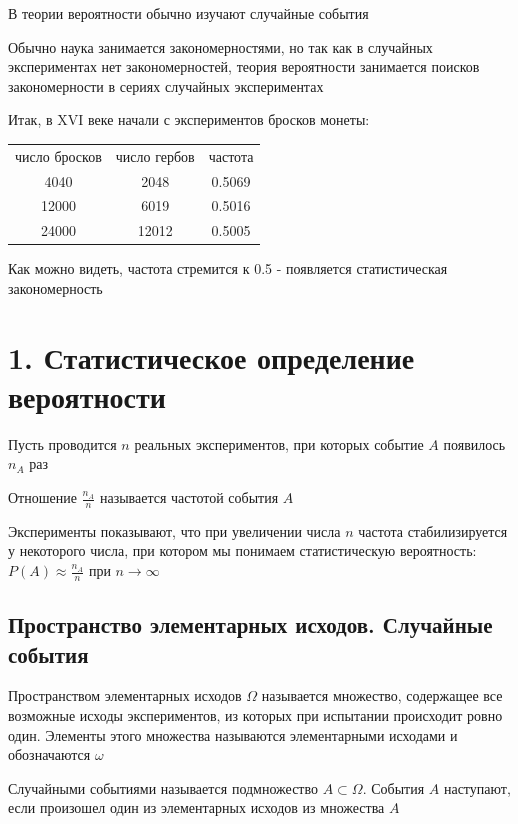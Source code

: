 \documentclass[12pt]{article}
\begin{document}
    \tableofcontents
    \clearpage


    В теории вероятности обычно изучают случайные события

    Обычно наука занимается закономерностями, но так как в случайных экспериментах нет закономерностей, теория
    вероятности занимается поисков закономерности в сериях случайных экспериментах

    Итак, в XVI веке начали с экспериментов бросков монеты:

    \begin{tabular}{ccc}
        число бросков & число гербов & частота \\
        4040 & 2048 & 0.5069 \\
        12000 & 6019 & 0.5016 \\
        24000 & 12012 & 0.5005 \\
    \end{tabular}

    Как можно видеть, частота стремится к 0.5 - появляется статистическая закономерность

    \section{1. Статистическое определение вероятности}

    Пусть проводится $n$ реальных экспериментов, при которых событие $A$ появилось $n_A$ раз

    Отношение $\frac{n_A}{n}$ называется частотой события $A$

    Эксперименты показывают, что при увеличении числа $n$ частота стабилизируется у некоторого числа,
    при котором мы понимаем статистическую вероятность: $P(A) \approx \frac{n_A}{n}$ при $n \to \infty$

    \subsection{Пространство элементарных исходов. Случайные события}

    \Def Пространством элементарных исходов $\Omega$ называется множество, содержащее все возможные исходы
    экспериментов, из которых при испытании происходит ровно один. Элементы этого множества называются
    элементарными исходами и обозначаются $\omega$

    \Def Случайными событиями называется подмножество $A \subset \Omega$. События $A$ наступают, если произошел один из
    элементарных исходов из множества $A$
\end{document}
